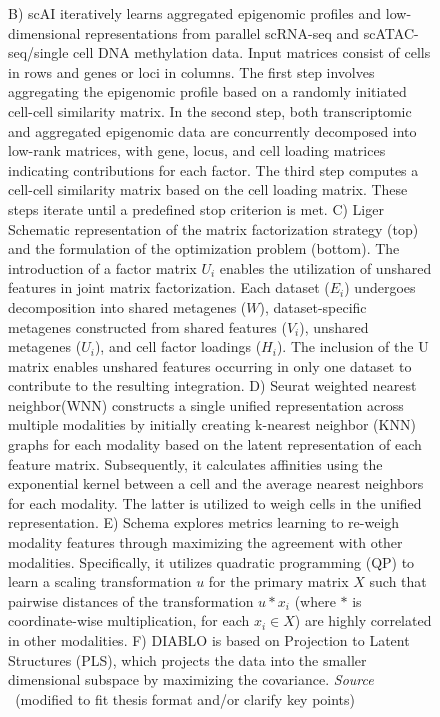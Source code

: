\addtocounter{figure}{-1}
\begin{figure}[t!]
  \caption[]{
	B) scAI iteratively learns aggregated epigenomic profiles and low-dimensional representations from parallel scRNA-seq and scATAC-seq/single cell DNA methylation data. Input matrices consist of cells in rows and genes or loci in columns. The first step involves aggregating the epigenomic profile based on a randomly initiated cell-cell similarity matrix. In the second step, both transcriptomic and aggregated epigenomic data are concurrently decomposed into low-rank matrices, with gene, locus, and cell loading matrices indicating contributions for each factor. The third step computes a cell-cell similarity matrix based on the cell loading matrix. These steps iterate until a predefined stop criterion is met.
	C) Liger Schematic representation of the matrix factorization strategy (top) and the formulation of the optimization problem (bottom). The introduction of a factor matrix $U_i$ enables the utilization of unshared features in joint matrix factorization. Each dataset ($E_i$) undergoes decomposition into shared metagenes ($W$), dataset-specific metagenes constructed from shared features ($V_i$), unshared metagenes ($U_i$), and cell factor loadings ($H_i$). The inclusion of the U matrix enables unshared features occurring in only one dataset to contribute to the resulting integration.
	D) Seurat weighted nearest neighbor(WNN) constructs a single unified representation across multiple modalities by initially creating k-nearest neighbor (KNN) graphs for each modality based on the latent representation of each feature matrix. Subsequently, it calculates affinities using the exponential kernel between a cell and the average nearest neighbors for each modality. The latter is utilized to weigh cells in the unified representation.
	E) Schema explores metrics learning to re-weigh modality features through maximizing the agreement with other modalities. Specifically, it utilizes quadratic programming (QP) to learn a scaling transformation $u$ for the primary matrix $X$ such that pairwise distances of the transformation $u * x_i$ (where $*$ is coordinate-wise multiplication, for each $x_i\in X$) are highly correlated in other modalities.
	F) DIABLO is based on Projection to Latent Structures (PLS), which projects the data into the smaller dimensional subspace by maximizing the covariance. \emph{Source ~\cite{tewari2017mofa,jin2020scai,kriebel2022uinmf,hao2021seurat4,singh2021schema,singh2019diablo}}(modified to fit thesis format and/or clarify key points)
  }
\end{figure}
